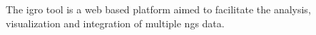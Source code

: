 The \gls{igro} tool is a web based platform aimed to facilitate the analysis, visualization and integration of multiple \gls{ngs} data.
